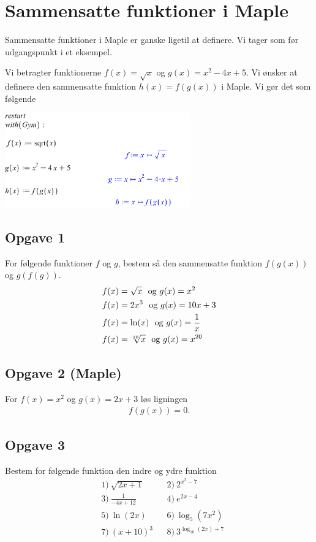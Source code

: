 \section*{Sammensatte funktioner i Maple}

Sammensatte funktioner i Maple er ganske ligetil at definere. Vi tager som før udgangspunkt i et eksempel.
\begin{exa}
	Vi betragter funktionerne $f(x) = \sqrt{x}$ og $g(x) = x^2 - 4x  + 5$. Vi ønsker at definere den 
	sammensatte funktion $h(x) = f(g(x))$ i Maple. Vi gør det som følgende
	\begin{center}
		\includegraphics[width=0.6\textwidth]{Billeder/sammensatMaple}
	\end{center}
\end{exa}



\subsection*{Opgave 1}
For følgende funktioner $f$ og $g$, bestem så den sammensatte funktion $f(g(x))$ og $g(f(g))$.
\begin{align*}
&f(x) = \sqrt{x}\  \textnormal{ og } g(x) = x^2\\
&f(x) = 2x^3\  \textnormal{ og } g(x) = 10x+3\\
&f(x) = \ln(x)\  \textnormal{ og } g(x) = \frac{1}{x}\\
&f(x) = \sqrt[10]{x}\  \textnormal{ og } g(x) = x^{20}
\end{align*}
\subsection*{Opgave 2 (Maple)}
For $f(x) = x^2$ og $g(x)=2x+3$ løs ligningen
\begin{align*}
f(g(x)) = 0.
\end{align*}

\subsection*{Opgave 3}
Bestem for følgende funktion den indre og ydre funktion
\begin{align*}
	&1) \ \sqrt{2x+1}   &&2) \  2^{x^2-7}     \\
	&3) \ \frac{1}{-4x+12}   &&4) \ e^{2x-4}      \\
	&5) \ \ln(2x)   &&6) \  \log_5(7x^2)     \\
	&7) \ (x+10)^3   &&8) \  3^{\log_{10}(2x)+7}       \\
\end{align*}

